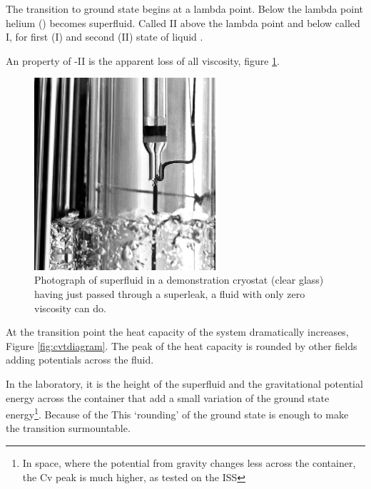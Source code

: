 The transition to ground state begins at a lambda point.
Below the lambda point helium (\he) becomes superfluid. Called \he II above the lambda point 
and below called \he I, for first (I) and second (II) state of liquid \he.

An property of \he-II is the apparent loss of all viscosity, figure \ref{fig:superfluid}.

\begin{figure}[htb]
\centering
\includegraphics[width = 0.6\textwidth]{pics/superfluid.JPG}
\caption{Photograph of superfluid in a demonstration cryostat (clear glass) having just passed 
through a superleak, a fluid with only zero viscosity can do.\label{fig:superfluid}}
\end{figure}

At the transition point the heat capacity of the system dramatically increases, Figure \ref{fig:cvtdiagram}.
The peak of the heat capacity is rounded by other fields adding potentials across the fluid.

In the laboratory, it is the height of the superfluid and the 
gravitational potential energy across the
container that add a small variation of the
ground state energy\footnote{In space, where the potential from gravity changes less across the
container, the Cv peak is much higher, as tested on the ISS}.
Because of the 
This `rounding' of the ground state is enough to make the transition surmountable\cite{microgravity}.

